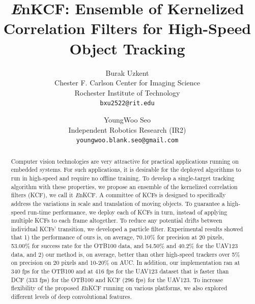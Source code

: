 \documentclass[10pt,twocolumn,letterpaper]{article}
\begin{document}
\title{{\it E}nKCF: Ensemble of Kernelized Correlation Filters for
  High-Speed Object Tracking}

\author{Burak Uzkent \\
Chester F. Carlson Center for Imaging Science\\
Rochester Institute of Technology\\
{\tt\small bxu2522@rit.edu}
\and
YoungWoo Seo \\
Independent Robotics Research (IR2)\\
{\tt\small youngwoo.blank.seo@gmail.com}
}

\maketitle
\ifwacvfinal\thispagestyle{empty}\fi

\begin{abstract}
Computer vision technologies are very attractive for practical
applications running on embedded systems. For such applications, it is
desirable for the deployed algorithms to run in high-speed and require
no offline training. To develop a single-target tracking algorithm
with these properties, we propose an ensemble of the kernelized
correlation filters (KCF), we call it {\it E}nKCF. A committee of KCFs
is designed to specifically address the variations in scale and
translation of moving objects. To guarantee a high-speed run-time
performance, we deploy each of KCFs in turn, instead of applying
multiple KCFs to each frame altogether. To reduce any potential drifts
between individual KCFs' transition, we developed a particle
filter. Experimental results showed that 1) the performance of ours
is, on average, 70.10\% for precision at 20 pixels, 53.00\% for
success rate for the OTB100 data, and 54.50\% and 40.2\% for the
UAV123 data, and 2) our method is, on average, better than other
high-speed trackers over 5\% on precision on 20 pixels and 10-20\% on
AUC. In addition, our implementation ran at 340 fps for the OTB100 and
at 416 fps for the UAV123 dataset that is faster than DCF (333 fps)
for the OTB100 and KCF (296 fps) for the UAV123. To increase
flexibility of the proposed {\it E}nKCF running on various platforms,
we also explored different levels of deep convolutional features.
\end{abstract}
\end{document}
